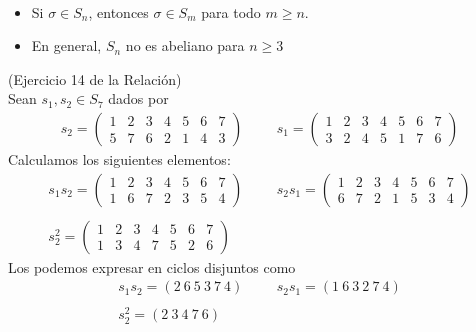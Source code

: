 \begin{observacion}\
    \begin{itemize}
        \item Si $\sigma \in S_n$, entonces $\sigma\in S_m$ para todo $m\geq n$.
        \item En general, $S_n$ no es abeliano para $n\geq 3$
    \end{itemize}
 \end{observacion}

 \begin{ejercicio}(Ejercicio 14 de la Relación)\\
    Sean $s_1, s_2\in S_7$ dados por
    \begin{gather*}
        s_2=\begin{pmatrix}
            1 & 2 & 3 & 4 & 5 & 6 & 7\\
            5 & 7 & 6 & 2 & 1 & 4 & 3
        \end{pmatrix}
        \hspace{1cm}
        s_1=\begin{pmatrix}
            1 & 2 & 3 & 4 & 5 & 6 & 7\\
            3 & 2 & 4 & 5 & 1 & 7 & 6
        \end{pmatrix}
    \end{gather*}
    Calculamos los siguientes elementos:
    \begin{gather*}
        s_1s_2=\begin{pmatrix}
            1 & 2 & 3 & 4 & 5 & 6 & 7\\
            1 & 6 & 7 & 2 & 3 & 5 & 4
        \end{pmatrix} 
        \hspace{1cm}
        s_2s_1=\begin{pmatrix}
            1 & 2 & 3 & 4 & 5 & 6 & 7\\
            6 & 7 & 2 & 1 & 5 & 3 & 4
        \end{pmatrix}\\\\
        s_2^2=\begin{pmatrix}
            1 & 2 & 3 & 4 & 5 & 6 & 7\\
            1 & 3 & 4 & 7 & 5 & 2 & 6
        \end{pmatrix}
    \end{gather*}
    Los podemos expresar en ciclos disjuntos como
    \begin{gather*}
        s_1s_2=(2\ 6\ 5\ 3\ 7\ 4)\hspace{1cm} s_2s_1=(1\ 6\ 3\ 2\ 7\ 4)\\\\
        s_2^2=(2\ 3\ 4\ 7\ 6)
    \end{gather*}
 \end{ejercicio}

